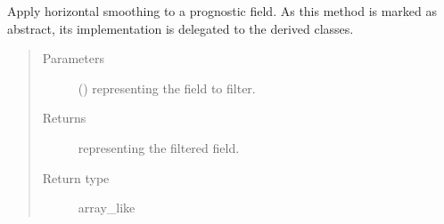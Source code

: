 \documentclass[letterpaper,10pt,english]{sphinxmanual}
\begin{document}
\begin{fulllineitems}
\begin{fulllineitems}
\begin{quote}
\begin{description}
\begin{itemize}
\end{itemize}

\end{description}\end{quote}

\end{fulllineitems}


\begin{fulllineitems}
\label{\detokenize{api:dycore.horizontal_smoothing.HorizontalSmoothing.apply}}
Apply horizontal smoothing to a prognostic field.
As this method is marked as abstract, its implementation is delegated to the derived classes.
\begin{quote}\begin{description}
\item[{Parameters}] \leavevmode
{} () \textendash{}  representing the field to filter.

\item[{Returns}] \leavevmode
{} representing the filtered field.

\item[{Return type}] \leavevmode
array\_like

\end{description}\end{quote}

\end{fulllineitems}



\end{fulllineitems}
\end{document}
